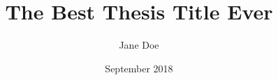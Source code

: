 \documentclass{article}
\title{The Best Thesis Title Ever}
\author{Jane Doe}
\date{September 2018}
\begin{document}
   \maketitle
   \blinddocument
   
\end{document}

